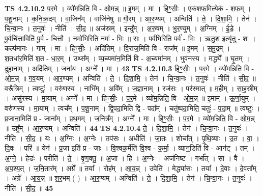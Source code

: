 \documentclass[17pt]{extarticle}
\begin{document}
                  \newline
                                \textbf{ TS 4.2.10.2} \newline
                  प॒र॒मे । व्यो॑म॒न्निति॒ वि - ओ॒म॒न्न् ॥ इ॒मम् । मा । हिꣳ॒॒सीः॒ । एक॑शफ॒मित्येक॑ - श॒फ॒म् । प॒शू॒नाम् । क॒नि॒क्र॒दम् । वा॒जिन᳚म् । वाजि॑नेषु ॥ गौ॒रम् । आ॒र॒ण्यम् । अन्विति॑ । ते॒ । दि॒शा॒मि॒ । तेन॑ । चि॒न्वा॒नः । त॒नुवः॑ । नीति॑ । सी॒द॒ ॥ अज॑स्रम् । इन्दु᳚म् । अ॒रु॒षम् । भु॒र॒ण्युम् । अ॒ग्निम् । ई॒डे॒ । पू॒र्वचि॑त्ता॒विति॑ पू॒र्व - चि॒त्तौ॒ । नमो॑भि॒रिति॒ नमः॑ - भिः॒ ॥ सः । पर्व॑भि॒रिति॒ पर्व॑ - भिः॒ । ऋ॒तु॒श इत्यृ॑तु - शः । कल्प॑मानः । गाम् । मा । हिꣳ॒॒सीः॒ । अदि॑तिम् । वि॒राज॒मिति॑ वि - राज᳚म् ॥ इ॒मम् । स॒मु॒द्रम् । श॒तधा॑र॒मिति॑ श॒त - धा॒र॒म् । उथ्स᳚म् । व्य॒च्यमा॑न॒मिति॑ वि - अ॒च्यमा॑नम् । भुव॑नस्य । मद्ध्ये᳚ ॥ घृ॒तम् । दुहा॑नाम् । अदि॑तिम् । जना॑य । अग्ने᳚ । मा । \textbf{  43} \newline
                  \newline
                                \textbf{ TS 4.2.10.3} \newline
                  हिꣳ॒॒सीः॒ । प॒र॒मे । व्यो॑म॒न्निति॒ वि - ओ॒म॒न्न् ॥ ग॒व॒यम् । आ॒र॒ण्यम् । अन्विति॑ । ते॒ । दि॒शा॒मि॒ । तेन॑ । चि॒न्वा॒नः । त॒नुवः॑ । नीति॑ । सी॒द॒ ॥ वरू᳚त्रिम् । त्वष्टुः॑ । वरु॑णस्य । नाभि᳚म् । अवि᳚म् । ज॒ज्ञा॒नाम् । रज॑सः । पर॑स्मात् ॥ म॒हीम् । सा॒ह॒स्रीम् । असु॑रस्य । मा॒याम् । अग्ने᳚ । मा । हिꣳ॒॒सीः॒ । प॒र॒मे । व्यो॑म॒न्निति॒ वि - ओ॒म॒न्न् ॥ इ॒माम् । ऊ॒र्णा॒युम् । वरु॑णस्य । मा॒याम् । त्वच᳚म् । प॒शू॒नाम् । द्वि॒पदा॒मिति॑ द्वि - पदा᳚म् । चतु॑ष्पदा॒मिति॒ चतुः॑ - प॒दा॒म् ॥ त्वष्टुः॑ । प्र॒जाना॒मिति॑ प्र - जाना᳚म् । प्र॒थ॒मम् । ज॒नित्र᳚म् । अग्ने᳚ । मा । हिꣳ॒॒सीः॒ । प॒र॒मे । व्यो॑म॒न्निति॒ वि - ओ॒म॒न्न् ॥ उष्ट्र᳚म् । आ॒र॒ण्यम् । अन्विति॑ । \textbf{  44} \newline
                  \newline
                                \textbf{ TS 4.2.10.4} \newline
                  ते॒ । दि॒शा॒मि॒ । तेन॑ । चि॒न्वा॒नः । त॒नुवः॑ । नीति॑ । सी॒द॒ ॥ यः । अ॒ग्निः । अ॒ग्नेः । तप॑सः । अधीति॑ । जा॒तः । शोचा᳚त् । पृ॒थि॒व्याः । उ॒त । वा॒ । दि॒वः । परि॑ ॥ येन॑ । प्र॒जा इति॑ प्र - जाः । वि॒श्वक॒र्मेति॑ वि॒श्व - क॒र्मा॒ । व्यान॒डिति॑ वि - आन॑ट् । तम् । अ॒ग्ने॒ । हेडः॑ । परीति॑ । ते॒ । वृ॒ण॒क्तु॒ ॥ अ॒जा । हि । अ॒ग्नेः । अज॑निष्ट । गर्भा᳚त् । सा । वै । अ॒प॒श्य॒त् । ज॒नि॒तार᳚म् । अग्रे᳚ ॥ तया᳚ । रोह᳚म् । आ॒य॒न्न् । उपेति॑ । मेद्ध्या॑सः । तया᳚ । दे॒वाः । दे॒वता᳚म् । अग्रे᳚ । आ॒य॒न्न् ॥ श॒र॒भम् ( ) । आ॒र॒ण्यम् । अन्विति॑ । ते॒ । दि॒शा॒मि॒ । तेन॑ । चि॒न्वा॒नः । त॒नुवः॑ । नीति॑ । सी॒द॒ ॥ \textbf{  45 } \newline
\end{document}
